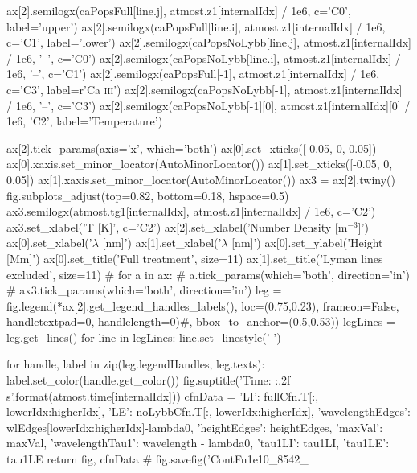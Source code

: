 \begin{pycode}[TimeDepRT]
    ax[2].semilogx(caPopsFull[line.j], atmost.z1[internalIdx] / 1e6, c='C0', label='upper')
    ax[2].semilogx(caPopsFull[line.i], atmost.z1[internalIdx] / 1e6, c='C1', label='lower')
    ax[2].semilogx(caPopsNoLybb[line.j], atmost.z1[internalIdx] / 1e6, '--', c='C0')
    ax[2].semilogx(caPopsNoLybb[line.i], atmost.z1[internalIdx] / 1e6, '--', c='C1')
    ax[2].semilogx(caPopsFull[-1], atmost.z1[internalIdx] / 1e6, c='C3', label=r'Ca \textsc{iii}')
    ax[2].semilogx(caPopsNoLybb[-1], atmost.z1[internalIdx] / 1e6, '--', c='C3')
    ax[2].semilogx(caPopsNoLybb[-1][0], atmost.z1[internalIdx][0] / 1e6, 'C2', label='Temperature')

    ax[2].tick_params(axis='x', which='both')
    ax[0].set_xticks([-0.05, 0, 0.05])
    ax[0].xaxis.set_minor_locator(AutoMinorLocator())
    ax[1].set_xticks([-0.05, 0, 0.05])
    ax[1].xaxis.set_minor_locator(AutoMinorLocator())
    ax3 = ax[2].twiny()
    fig.subplots_adjust(top=0.82, bottom=0.18, hspace=0.5)
    ax3.semilogx(atmost.tg1[internalIdx], atmost.z1[internalIdx] / 1e6, c='C2')
    ax3.set_xlabel('T [K]', c='C2')
    ax[2].set_xlabel('Number Density [m$^{-3}$]')
    ax[0].set_xlabel('$\lambda$ [nm]')
    ax[1].set_xlabel('$\lambda$ [nm]')
    ax[0].set_ylabel('Height [Mm]')
    ax[0].set_title('Full treatment', size=11)
    ax[1].set_title('Lyman lines excluded', size=11)
    # for a in ax:
    #     a.tick_params(which='both', direction='in')
    # ax3.tick_params(which='both', direction='in')
    leg = fig.legend(*ax[2].get_legend_handles_labels(), loc=(0.75,0.23), frameon=False, handletextpad=0, handlelength=0)#, bbox_to_anchor=(0.5,0.53))
    legLines = leg.get_lines()
    for line in legLines:
        line.set_linestyle(' ')

    for handle, label in zip(leg.legendHandles, leg.texts):
        label.set_color(handle.get_color())
    fig.suptitle('Time: {:.2f} s'.format(atmost.time[internalIdx]))
    cfnData = {'LI': fullCfn.T[:, lowerIdx:higherIdx], 'LE': noLybbCfn.T[:, lowerIdx:higherIdx],
               'wavelengthEdges': wlEdges[lowerIdx:higherIdx]-lambda0, 'heightEdges': heightEdges, 'maxVal': maxVal, 'wavelengthTau1': wavelength - lambda0,
               'tau1LI': tau1LI, 'tau1LE': tau1LE}
    return fig, cfnData
    # fig.savefig('ContFn1e10_8542_%


\end{pycode}
